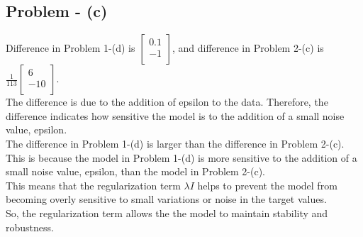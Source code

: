 \documentclass{article}
\begin{document}
\subsection{Problem - (c)}
Difference in Problem 1-(d) is $\begin{bmatrix}
    0.1 \\
    -1\\
\end{bmatrix}$, and difference in Problem 2-(c) is $\frac{1}{113}\begin{bmatrix}
    6 \\
    -10\\
\end{bmatrix}$. \\
The difference is due to the addition of epsilon to the data. Therefore, the difference indicates how sensitive the model is to the addition of a small noise value, epsilon. \\
The difference in Problem 1-(d) is larger than the difference in Problem 2-(c). This is because the model in Problem 1-(d) is more sensitive to the addition of a small noise value, epsilon, than the model in Problem 2-(c). \\
This means that the regularization term $\lambda I$ helps to prevent the model from becoming overly sensitive to small variations or noise in the target values. \\
So, the regularization term allows the the model to maintain stability and robustness.
\end{document}
